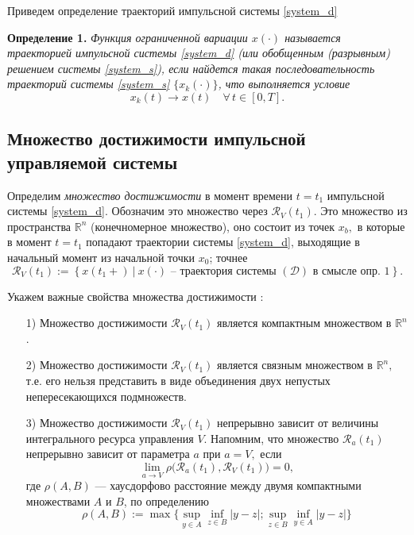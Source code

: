 \documentclass[a4paper,12pt]{article}
\begin{document}
Приведем определение траекторий импульсной системы \eqref{system_d}

{\bf Определение 1.}
{\it Функция ограниченной вариации $x(\cdot)$ называется траекторией
импульсной системы \eqref{system_d} (или обобщенным (разрывным)
решением системы \eqref{system_s}), если найдется такая последовательность
траекторий системы \eqref{system_s} $\bigl\{x_k(\cdot)\bigr\}$, что выполняется
условие 
\begin{equation*}
    x_k(t)\to x(t) \quad  \forall \, t\in [0,T].
\end{equation*}}

\subsection{Множество достижимости импульсной управляемой системы}
\label{sec:rsids}


Определим \emph{множество достижимости} в момент  времени $t=t_1$
импульсной системы \eqref{system_d}. Обозначим это множество через 
$ {\mathcal R}_V(t_1)$. Это множество из  пространства ${\mathbb R}^n$
(конечномерное  множество), оно состоит из точек $x_b,$ в  которые в
момент $t=t_1$ попадают траектории  системы \eqref{system_d}, выходящие
в начальный  момент из начальной точки $x_0$; точнее
\begin{equation*} 
    {\mathcal R}_V(t_1):=\left\{ x(t_1+) \ \big| \
    x(\cdot) \mbox{ -- траектория системы } ({\mathcal D}) \mbox{ в
    смысле опр. 1} \right\}.
\end{equation*}

Укажем важные свойства множества достижимости \cite{ZS1991, SS2010}:

\begin{itemize}
    \item[ 1)] Множество достижимости ${\mathcal R}_V(t_1)$ является
        компактным множеством в ${\mathbb R}^n$.
    \item[ 2)] Множество достижимости ${\mathcal R}_V(t_1)$ является связным
        множеством в ${\mathbb R}^n,$ т.е. его нельзя представить в виде
        объединения двух непустых непересекающихся подмножеств.
    \item[ 3)] Множество достижимости ${\mathcal R}_V(t_1)$ непрерывно
        зависит от величины интегрального ресурса управления $V$. Напомним,
        что множество ${\mathcal R}_a(t_1)$ непрерывно зависит от параметра $a$
        при $a=V,$ если
        \begin{equation*} 
            \lim_{a\to V} \rho\Big( {\mathcal R}_a(t_1) , {\mathcal
            R}_V(t_1) \Big) =0 ,
        \end{equation*} где $\rho(A,B)$ --- хаусдорфово расстояние между двумя компактными
        множествами $A$ и $B$, по определению
        \begin{equation}
            \label{eq:hausd_dist}
            \rho(A,B):=\max\bigl\{ \sup\limits_{y\in
            A}\inf\limits_{z\in B} |y-z| ; \sup\limits_{z\in B}\inf\limits_{y\in
            A} |y-z| \bigr\}
        \end{equation}
\end{itemize}
\end{document}
